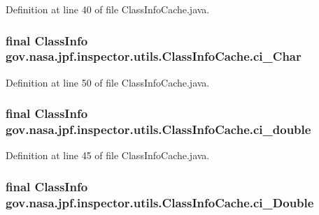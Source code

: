Definition at line 40 of file Class\+Info\+Cache.\+java.

\subsubsection[{\texorpdfstring{ci\+\_\+\+Char}{ci_Char}}]{\setlength{\rightskip}{0pt plus 5cm}final Class\+Info gov.\+nasa.\+jpf.\+inspector.\+utils.\+Class\+Info\+Cache.\+ci\+\_\+\+Char}\hypertarget{classgov_1_1nasa_1_1jpf_1_1inspector_1_1utils_1_1_class_info_cache_ad3da5c1749b2386757dda5c6ade36db6}{}\label{classgov_1_1nasa_1_1jpf_1_1inspector_1_1utils_1_1_class_info_cache_ad3da5c1749b2386757dda5c6ade36db6}


Definition at line 50 of file Class\+Info\+Cache.\+java.

\subsubsection[{\texorpdfstring{ci\+\_\+double}{ci_double}}]{\setlength{\rightskip}{0pt plus 5cm}final Class\+Info gov.\+nasa.\+jpf.\+inspector.\+utils.\+Class\+Info\+Cache.\+ci\+\_\+double}\hypertarget{classgov_1_1nasa_1_1jpf_1_1inspector_1_1utils_1_1_class_info_cache_a6c235608a009075b8eca6c1b6790a056}{}\label{classgov_1_1nasa_1_1jpf_1_1inspector_1_1utils_1_1_class_info_cache_a6c235608a009075b8eca6c1b6790a056}


Definition at line 45 of file Class\+Info\+Cache.\+java.

\subsubsection[{\texorpdfstring{ci\+\_\+\+Double}{ci_Double}}]{\setlength{\rightskip}{0pt plus 5cm}final Class\+Info gov.\+nasa.\+jpf.\+inspector.\+utils.\+Class\+Info\+Cache.\+ci\+\_\+\+Double}\hypertarget{classgov_1_1nasa_1_1jpf_1_1inspector_1_1utils_1_1_class_info_cache_a4dfcbcfdb6ef9b2061fb0532f281eeb8}{}\label{classgov_1_1nasa_1_1jpf_1_1inspector_1_1utils_1_1_class_info_cache_a4dfcbcfdb6ef9b2061fb0532f281eeb8}


